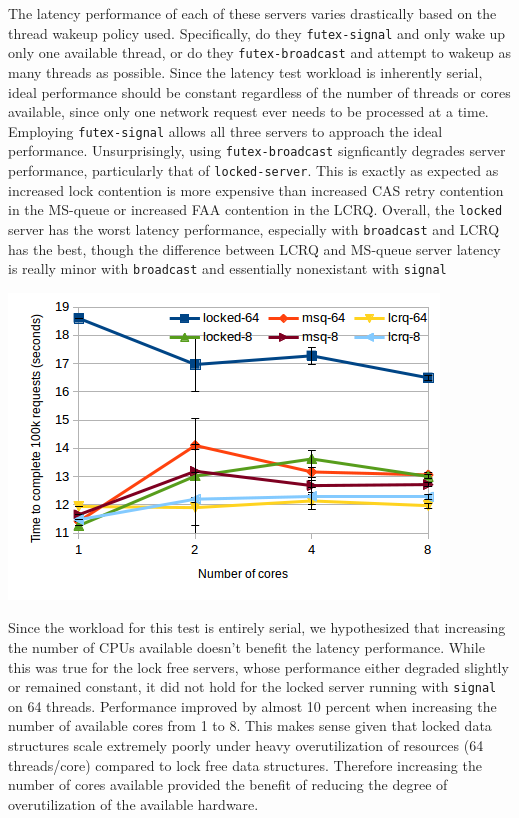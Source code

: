 \documentclass[twoside,10pt]{article}
\newenvironment{Figure}
  {\par\medskip\noindent\minipage{\linewidth}}
  {\endminipage\par\medskip}
\begin{document}
\begin{multicols}{2}
The latency performance of each of these servers varies drastically
based on the thread wakeup policy used. Specifically, do they
\verb+futex-signal+ and only wake up only one available thread, or do
they \verb+futex-broadcast+ and attempt to wakeup as many threads as
possible. Since the latency test workload is inherently serial, ideal
performance should be constant regardless of the number of threads or
cores available, since only one network request ever needs to be
processed at a time. Employing \verb+futex-signal+ allows all three
servers to approach the ideal performance. Unsurprisingly, using
\verb+futex-broadcast+ signficantly degrades server performance,
particularly that of \verb+locked-server+. This is exactly as expected
as increased lock contention is more expensive than increased CAS
retry contention in the MS-queue or increased FAA contention in the
LCRQ. Overall, the \verb+locked+ server has the worst latency performance,
especially with \verb+broadcast+ and LCRQ has the best, though the difference
between LCRQ and MS-queue server latency is really minor with 
\verb+broadcast+ and essentially nonexistant with \verb+signal+

\begin{Figure}
  \includegraphics[width=\linewidth]{img/latencyncores.png}
\end{Figure}

Since the workload for this test is entirely serial, we hypothesized that
increasing the number of CPUs available doesn't benefit the latency
performance. While this was true for the lock free servers, whose performance
either degraded slightly or remained constant, it did not hold for the locked server running with \verb+signal+ on 64 threads. Performance improved by
almost 10 percent when increasing the number of available cores from 1 to 8. 
This makes sense given that locked data structures scale extremely poorly under
heavy overutilization of resources (64 threads/core) compared to lock free 
data structures. Therefore increasing the number of cores available provided 
the benefit of reducing the degree of overutilization of the available hardware. 


\end{multicols}
\end{document}
